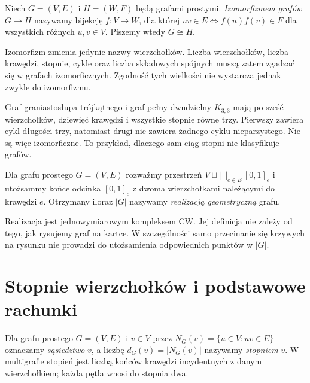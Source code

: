 \begin{definicja}[Izomorfizm]
Niech $G=(V,E)$ i $H=(W,F)$ będą grafami prostymi.
\emph{Izomorfizmem grafów} $G\to H$ nazywamy bijekcję
$f:V\to W$, dla której
$uv\in E\iff f(u)f(v)\in F$ dla wszystkich różnych $u,v\in V$.
Piszemy wtedy $G\cong H$.
\end{definicja}

Izomorfizm zmienia jedynie nazwy wierzchołków. Liczba wierzchołków,
liczba krawędzi, stopnie, cykle oraz liczba składowych spójnych
muszą zatem zgadzać się w grafach izomorficznych. Zgodność tych
wielkości nie wystarcza jednak zwykle do izomorfizmu.

\begin{przyklad}
Graf graniastosłupa trójkątnego i graf pełny dwudzielny $K_{3,3}$
mają po sześć wierzchołków, dziewięć krawędzi i wszystkie stopnie
równe trzy. Pierwszy zawiera cykl długości trzy, natomiast drugi
nie zawiera żadnego cyklu nieparzystego. Nie są więc izomorficzne.
To przykład, dlaczego sam ciąg stopni nie klasyfikuje grafów.
\end{przyklad}

\begin{definicja}
Dla grafu prostego $G=(V,E)$ rozważmy przestrzeń
$V\sqcup\bigsqcup_{e\in E}[0,1]_e$ i utożsammy
końce odcinka $[0,1]_e$ z dwoma wierzchołkami
należącymi do krawędzi $e$. Otrzymany iloraz
$|G|$ nazywamy \emph{realizacją geometryczną} grafu.
\end{definicja}

Realizacja jest jednowymiarowym kompleksem CW. Jej definicja nie
zależy od tego, jak rysujemy graf na kartce. W szczególności
samo przecinanie się krzywych na rysunku nie prowadzi do
utożsamienia odpowiednich punktów w $|G|$.

\section{Stopnie wierzchołków i podstawowe rachunki}
\label{sec:tg-stopnie}

\begin{definicja}[Stopień]
Dla grafu prostego $G=(V,E)$ i $v\in V$ przez
$N_G(v)=\{u\in V:uv\in E\}$ oznaczamy
\emph{sąsiedztwo} $v$, a liczbę $d_G(v)=|N_G(v)|$
nazywamy \emph{stopniem} $v$. W multigrafie stopień
jest liczbą końców krawędzi incydentnych z danym
wierzchołkiem; każda pętla wnosi do stopnia dwa.
\end{definicja}

